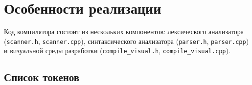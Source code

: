 \documentclass[a4paper,final]{article}
\begin{document}
\newpage
\section{Особенности реализации}

Код компилятора состоит из нескольких компонентов: лексического анализатора
(\texttt{scanner.h}, \texttt{scanner.cpp}), синтаксического анализатора
(\texttt{parser.h}, \texttt{parser.cpp}) и визуальной среды разработки
(\texttt{compile\_visual.h}, \texttt{compile\_visual.cpp}).

\subsection{Список токенов}
\end{document}
